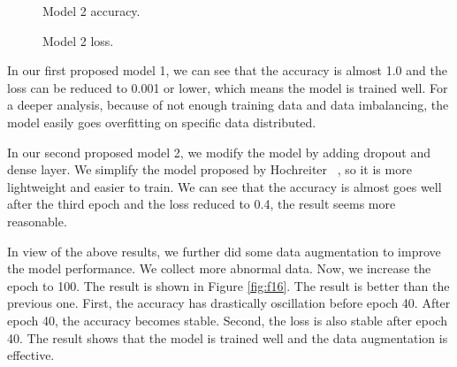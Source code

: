 \documentclass[10pt,twocolumn,letterpaper]{article}
\begin{document}
\begin{figure}[t]
    \centering
    \caption{Model 2 accuracy.}
    \label{fig:f14}
\end{figure}

\begin{figure}[t]
    \centering
    \caption{Model 2 loss.}
    \label{fig:f15}
\end{figure}

    In our first proposed model 1, we can see that the accuracy is almost 1.0 and the loss can be reduced to 0.001 or lower, which means the model is trained well. For a deeper analysis, because of not enough training data and data imbalancing, the model easily goes overfitting on specific data distributed.

    In our second proposed model 2, we modify the model by adding dropout and dense layer. We simplify the model proposed by Hochreiter \etal~\cite{10.1162/neco.1997.9.8.1735}, so it is more lightweight and easier to train. We can see that the accuracy is almost goes well after the third epoch and the loss reduced to 0.4, the result seems more reasonable.

    In view of the above results, we further did some data augmentation to improve the model performance. We collect more abnormal data. Now, we increase the epoch to 100. The result is shown in Figure \ref{fig:f16}. The result is better than the previous one. First, the accuracy has drastically oscillation before epoch 40. After epoch 40, the accuracy becomes stable. Second, the loss is also stable after epoch 40. The result shows that the model is trained well and the data augmentation is effective.
\end{document}
